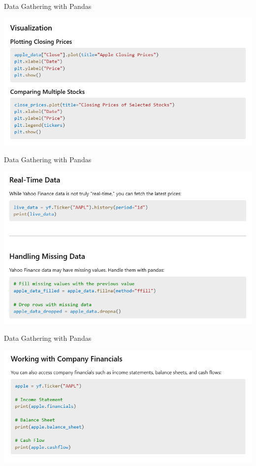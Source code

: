 \documentclass[11pt]{beamer}
\begin{document}
\begin{frame}{Data Gathering with Pandas}
	\begin{center}
	\includegraphics[scale=0.55]{../05-pictures/lesson-1-3_pic_16.png}
	\end{center}
\end{frame}
\begin{frame}{Data Gathering with Pandas}
	\begin{center}
	\includegraphics[scale=0.55]{../05-pictures/lesson-1-3_pic_17.png}
	\end{center}
\end{frame}
\begin{frame}{Data Gathering with Pandas}
	\begin{center}
	\includegraphics[scale=0.55]{../05-pictures/lesson-1-3_pic_18.png}
	\end{center}
\end{frame}
\end{document}
